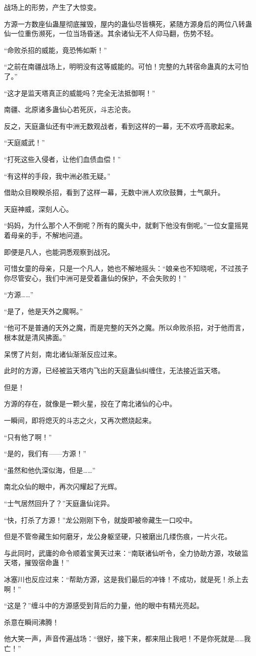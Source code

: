 \begin{this_body}
战场上的形势，产生了大惊变。

方源一方数座仙蛊屋彻底摧毁，屋内的蛊仙尽皆横死，紧随方源身后的两位八转蛊仙一位重伤濒死，一位当场昏迷。其余诸仙无不人仰马翻，伤势不轻。

“命败杀招的威能，竟恐怖如斯！”

“之前在南疆战场上，明明没有这等威能的。可怕！完整的九转宿命蛊真的太可怕了。”

“这才是监天塔真正的威能吗？完全无法抵御啊！”

南疆、北原诸多蛊仙心若死灰，斗志沦丧。

反之，天庭蛊仙还有中洲无数观战者，看到这样的一幕，无不欢呼高歌起来。

“天庭威武！”

“打死这些入侵者，让他们血债血偿！”

“有这样的手段，我中洲必胜无疑。”

借助众目睽睽杀招，看到了这样一幕，无数中洲人欢欣鼓舞，士气飙升。

天庭神威，深刻人心。

“妈妈，为什么那个人不倒呢？所有的魔头中，就剩下他没有倒呢。”一位女童摇晃着母亲的手，不解地问道。

即便是凡人，也能洞悉观察到战况。

可惜女童的母亲，只是一个凡人，她也不解地摇头：“娘亲也不知晓呢，不过孩子你尽管安心，我们中洲可是受着蛊仙的保护，不会失败的！”

“方源……”

“是了，他是天外之魔啊。”

“他可不是普通的天外之魔，而是完整的天外之魔。所以命败杀招，对于他而言，根本就是清风拂面。”

呆愣了片刻，南北诸仙渐渐反应过来。

此时的方源，已经被监天塔内飞出的天庭蛊仙纠缠住，无法接近监天塔。

但是！

方源的存在，就像是一颗火星，投在了南北诸仙的心中。

一瞬间，即将熄灭的斗志之火，又再次燃烧起来。

“只有他了啊！”

“是的，我们有——方源！”

“虽然和他仇深似海，但是……”

南北众仙的眼中，再次闪耀起了光辉。

“士气居然回升了？”天庭蛊仙诧异。

“快，打杀了方源！”龙公刚刚下令，就旋即被帝藏生一口咬中。

但是不管帝藏生如何磨牙，龙公身躯坚硬，只被磨出几缕伤痕，一片火花。

与此同时，武庸的命令顺着宝黄天过来：“南联诸仙听令，全力协助方源，攻破监天塔，摧毁宿命蛊！”

冰塞川也反应过来：“帮助方源，这是我们最后的冲锋！不成功，就是死！杀上去啊！”

“这是？”缠斗中的方源感受到背后的力量，他的眼中有精光亮起。

杀意在瞬间沸腾！

他大笑一声，声音传遍战场：“很好，接下来，都来阻止我吧！不是你死就是……我亡！”

\end{this_body}

